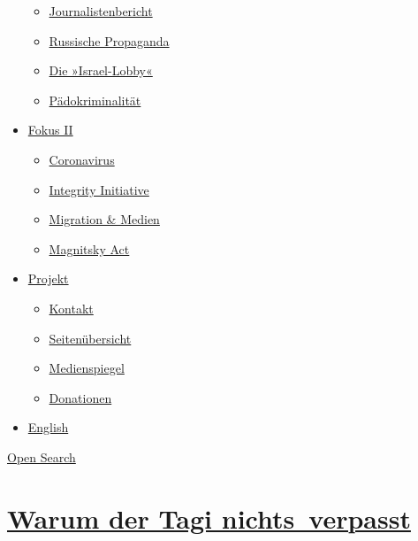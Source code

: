 \begin{itemize}
  \begin{itemize}
  \tightlist
  \item
    \href{https://swprs.org/bericht-eines-journalisten/}{Journalistenbericht}
  \item
    \href{https://swprs.org/russische-propaganda/}{Russische Propaganda}
  \item
    \href{https://swprs.org/die-israel-lobby-fakten-und-mythen/}{Die
    »Israel-Lobby«}
  \item
    \href{https://swprs.org/geopolitik-und-paedokriminalitaet/}{Pädokriminalität}
  \end{itemize}
\item
  \href{https://swprs.org/migration-und-medien/}{Fokus II}

  \begin{itemize}
  \tightlist
  \item
    \href{https://swprs.org/covid-19-hinweis-ii/}{Coronavirus}
  \item
    \href{https://swprs.org/die-integrity-initiative/}{Integrity
    Initiative}
  \item
    \href{https://swprs.org/migration-und-medien/}{Migration \& Medien}
  \item
    \href{https://swprs.org/der-fall-magnitsky/}{Magnitsky Act}
  \end{itemize}
\item
  \href{https://swprs.org/kontakt/}{Projekt}

  \begin{itemize}
  \tightlist
  \item
    \href{https://swprs.org/kontakt/}{Kontakt}
  \item
    \href{https://swprs.org/uebersicht/}{Seitenübersicht}
  \item
    \href{https://swprs.org/medienspiegel/}{Medienspiegel}
  \item
    \href{https://swprs.org/donationen/}{Donationen}
  \end{itemize}
\item
  \href{https://swprs.org/contact/}{English}
\end{itemize}

\protect\hyperlink{}{Open Search}

\hypertarget{warum-der-tagi-nichts-verpasst}{%
\section{\texorpdfstring{\href{https://swprs.org/2017/03/01/warum-der-tagesanzeiger-nichts-verpasst/}{Warum
der Tagi
nichts~verpasst}}{Warum der Tagi nichts~verpasst}}\label{warum-der-tagi-nichts-verpasst}}

